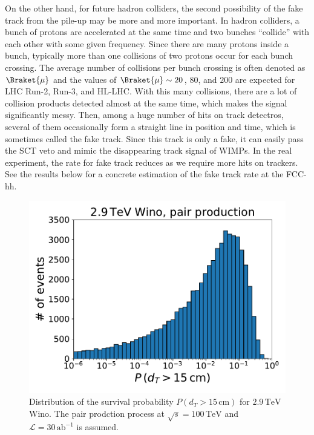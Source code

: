 \documentclass[12pt,twoside,book]{article}
\begin{document}
On the other hand, for future hadron colliders, the second possibility of the fake track from the pile-up may be more and more important.
In hadron colliders, a bunch of protons are accelerated at the same time and two bunches ``collide'' with each other with some given frequency.
Since there are many protons inside a bunch, typically more than one collisions of two protons occur for each bunch crossing.
The average number of collisions per bunch crossing is often denoted as $\Braket{\mu}$ and the values of $\Braket{\mu} \sim 20$, $80$, and $200$ are expected for LHC Run-2, Run-3, and HL-LHC.
With this many collisions, there are a lot of collision products detected almost at the same time, which makes the signal significantly messy.
Then, among a huge number of hits on track detectros, several of them occasionally form a straight line in position and time, which is sometimes called the fake track.
Since this track is only a fake, it can easily pass the SCT veto and mimic the disappearing track signal of WIMPs.
In the real experiment, the rate for fake track reduces as we require more hits on trackers.
See the results below for a concrete estimation of the fake track rate at the FCC-hh.

\begin{figure}[t]
  \centering
  \includegraphics[width=0.5\hsize]{survival_probability.pdf}
  \caption{
    Distribution of the survival probability $P(d_T > 15\,\mathrm{cm})$ for $2.9\,\mathrm{TeV}$ Wino.
    The pair prodction process at $\sqrt{s}=100\,\mathrm{TeV}$ and $\mathcal{L} = 30\,\mathrm{ab}^{-1}$ is assumed.}
  \label{fig:survival_probability}
\end{figure}
\end{document}
